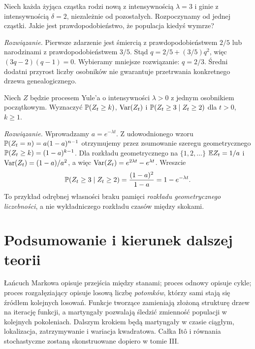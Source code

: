 \begin{zadanie}
Niech każda żyjąca cząstka rodzi nową z intensywnością
$\lambda=3$ i ginie z intensywnością $\delta=2$,
niezależnie od pozostałych. Rozpoczynamy od jednej cząstki.
Jakie jest prawdopodobieństwo, że populacja kiedyś wymrze?

\emph{Rozwiązanie.} Pierwsze zdarzenie jest śmiercią
z prawdopodobieństwem $2/5$ lub narodzinami z prawdopodobieństwem
$3/5$. Stąd $q=2/5+(3/5)q^2$, więc
$(3q-2)(q-1)=0$.
Wybieramy mniejsze rozwiązanie: $q=2/3$.
Średni dodatni przyrost liczby osobników nie gwarantuje
przetrwania konkretnego drzewa genealogicznego.
\end{zadanie}


\begin{zadanie}
Niech $Z$ będzie procesem Yule'a o intensywności $\lambda>0$
z jednym osobnikiem początkowym. Wyznaczyć
$\mathbb{P}(Z_t\ge k)$, $\operatorname{Var}(Z_t)$ i
$\mathbb{P}(Z_t\ge3\mid Z_t\ge2)$ dla $t>0$, $k\ge1$.

\emph{Rozwiązanie.} Wprowadzamy $a=e^{-\lambda t}$.
Z udowodnionego wzoru $\mathbb{P}(Z_t=n)=a(1-a)^{n-1}$
otrzymujemy przez zsumowanie szeregu geometrycznego
$\mathbb{P}(Z_t\ge k)=(1-a)^{k-1}$.
Dla rozkładu geometrycznego na $\{1,2,\dots\}$
$\mathbb{E} Z_t=1/a$ i $\operatorname{Var}(Z_t)=(1-a)/a^2$, a więc
$\operatorname{Var}(Z_t)=e^{2\lambda t}-e^{\lambda t}$.
Wreszcie
\[
\mathbb{P}(Z_t\ge3\mid Z_t\ge2)
=\frac{(1-a)^2}{1-a}=1-e^{-\lambda t}.
\]
To przykład odrębnej własności braku pamięci
\emph{rozkładu geometrycznego liczebności},
a nie wykładniczego rozkładu czasów między skokami.
\end{zadanie}

\section{Podsumowanie i kierunek dalszej teorii}
Łańcuch Markowa opisuje przejścia między stanami;
proces odnowy opisuje cykle; proces rozgałęziający
opisuje losową liczbę \emph{potomków}, którzy sami
stają się źródłem kolejnych losowań. Funkcje tworzące
zamieniają złożoną strukturę drzew na iterację funkcji,
a martyngały pozwalają śledzić zmienność populacji
w kolejnych pokoleniach. Dalszym krokiem będą martyngały w czasie ciągłym, lokalizacja,
zatrzymywanie i wariacja kwadratowa. Całka Itô i równania
stochastyczne zostaną skonstruowane dopiero w tomie III.



